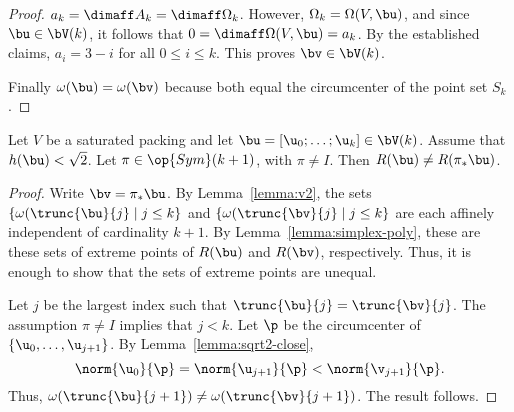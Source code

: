 \begin{proof}
$a_k = \dimaff A_k=\dimaff \Omega_k$.  However, $\Omega_k=
\Omega(V,\bu)$, and since $\bu\in \bV(k)$, it follows that $0=\dimaff\Omega(V,\bu)=a_k$.
By the established claims, $a_i = 3-i$ for all $0\le i\le k$.  This proves $\bv\in\bV(k)$.

Finally $\omega(\bu) = \omega(\bv)$ because both equal the circumcenter of the
point set $S_k$.
%
\end{proof}

\begin{lemma}[] 
  Let $V$ be a saturated packing and let $\bu = [\u_0;\ldots;\u_k]\in
  \bV(k)$.  Assume that $h(\bu)<\sqrt2$.  Let $\pi\in\op{Sym}(k+1)$, with $\pi\ne I$.
  Then $R(\bu)\ne R(\pi_*\bu)$.
\end{lemma}

\begin{proof} 
Write $\bv = \pi_*\bu$.  By Lemma~\ref{lemma:v2}, the sets
$\{\omega(\trunc{\bu}{j}\mid j\le k\}$ and 
$\{\omega(\trunc{\bv}{j}\mid j\le k\}$ are each affinely independent of
cardinality $k+1$.  By Lemma~\ref{lemma:simplex-poly}, these are these sets
of extreme points of $R(\bu)$ and $R(\bv)$, respectively.  Thus, it is enough
to show that the sets of extreme points are unequal.

Let $j$ be the largest index such that $\trunc{\bu}{j}=\trunc{\bv}{j}$.
The assumption $\pi\ne I$ implies that $j<k$.  Let $\p$ be the circumcenter
of $\{\u_0,\ldots,\u_{j+1}\}$.  By Lemma~\ref{lemma:sqrt2-close}, 
\begin{displaymath} 
\norm{\u_0}{\p} = \norm{\u_{j+1}}{\p} < \norm{\v_{j+1}}{\p}.
\end{displaymath}
Thus, $\omega(\trunc{\bu}{j+1}) \ne \omega(\trunc{\bv}{j+1})$.  The result follows.
\end{proof}

